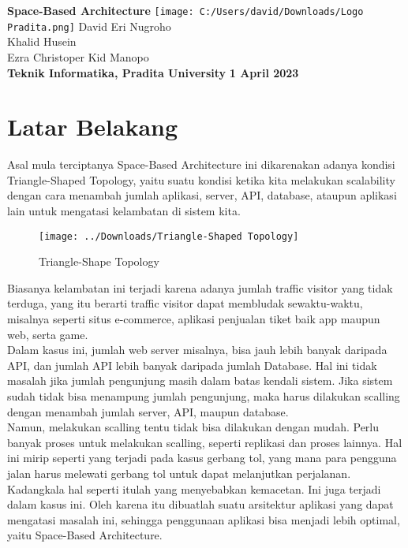\documentclass[a4paper]{report}
\begin{document}
	\begin{titlepage}
		\centering
		{\textbf{\Huge{Space-Based Architecture}}}
		\vskip2cm
		\texttt{[image: C:/Users/david/Downloads/Logo Pradita.png]}
		\vskip2cm
		{\large David Eri Nugroho\\\large Khalid Husein\\\large Ezra Christoper Kid Manopo\\
			\vskip1cm
			{\textbf{\Large Teknik Informatika, Pradita University}}}
		\vfill
		{\textbf{\Large 1 April 2023\\}}
	\end{titlepage}
	\section*{\huge{Latar Belakang}}
	\large Asal mula terciptanya Space-Based Architecture ini dikarenakan adanya kondisi Triangle-Shaped Topology, yaitu suatu kondisi ketika kita melakukan scalability dengan cara menambah jumlah aplikasi, server, API, database, ataupun aplikasi lain untuk mengatasi kelambatan di sistem kita.\\
	\vskip0.15cm
	\begin{figure}
		\centering
		\texttt{[image: ../Downloads/Triangle-Shaped Topology]}
		\caption{Triangle-Shape Topology}
	\end{figure}
	\vskip0.15cm
	Biasanya kelambatan ini terjadi karena adanya jumlah traffic visitor yang tidak terduga, yang itu berarti traffic visitor dapat membludak sewaktu-waktu, misalnya seperti situs e-commerce, aplikasi penjualan tiket baik app maupun web, serta game.\\
	
	Dalam kasus ini, jumlah web server misalnya, bisa jauh lebih banyak daripada API, dan jumlah API lebih banyak daripada jumlah Database. Hal ini tidak masalah jika jumlah pengunjung masih dalam batas kendali sistem. Jika sistem sudah tidak bisa menampung jumlah pengunjung, maka harus dilakukan scalling dengan menambah jumlah server, API, maupun database.\\
	
	Namun, melakukan scalling tentu tidak bisa dilakukan dengan mudah. Perlu banyak proses untuk melakukan scalling, seperti replikasi dan proses lainnya. Hal ini mirip seperti yang terjadi pada kasus gerbang tol, yang mana para pengguna jalan harus melewati gerbang tol untuk dapat melanjutkan perjalanan.\\
	
	Kadangkala hal seperti itulah yang menyebabkan kemacetan. Ini juga terjadi dalam kasus ini. Oleh karena itu dibuatlah suatu arsitektur aplikasi yang dapat mengatasi masalah ini, sehingga penggunaan aplikasi bisa menjadi lebih optimal, yaitu Space-Based Architecture.
	\vskip0.5cm
\end{document}
